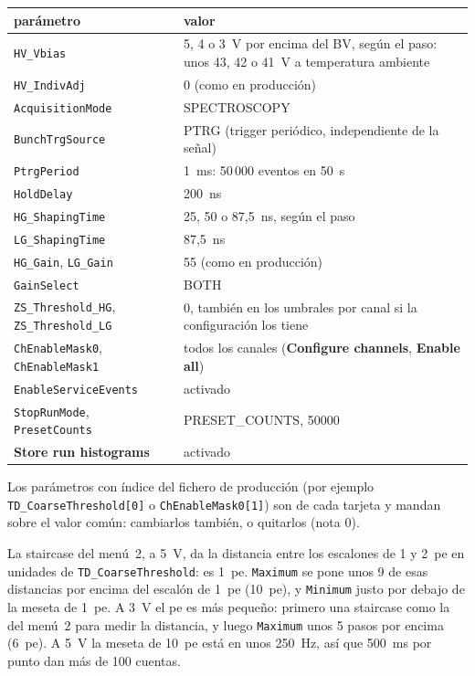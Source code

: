 \documentclass[11pt,a4paper]{article}
\begin{document}
\begin{center}
\small
\begin{tabular}{p{} p{}}
\hline
parámetro & valor \\
\hline
\texttt{HV\_Vbias} & 5, 4 o 3~V por encima del BV, según el paso: unos 43,
42 o 41~V a temperatura ambiente \\
\texttt{HV\_IndivAdj} & 0 (como en producción) \\
\texttt{AcquisitionMode} & SPECTROSCOPY \\
\texttt{BunchTrgSource} & PTRG (trigger periódico, independiente de la señal) \\
\texttt{PtrgPeriod} & 1~ms: 50\,000 eventos en 50~s \\
\texttt{HoldDelay} & 200~ns \\
\texttt{HG\_ShapingTime} & 25, 50 o 87,5~ns, según el paso \\
\texttt{LG\_ShapingTime} & 87,5~ns \\
\texttt{HG\_Gain}, \texttt{LG\_Gain} & 55 (como en producción) \\
\texttt{GainSelect} & BOTH \\
\texttt{ZS\_Threshold\_HG}, \texttt{ZS\_Threshold\_LG} & 0, también en los
umbrales por canal si la configuración los tiene \\
\texttt{ChEnableMask0}, \texttt{ChEnableMask1} & todos los canales
({\bf Configure channels}, {\bf Enable all}) \\
\texttt{EnableServiceEvents} & activado \\
\texttt{StopRunMode}, \texttt{PresetCounts} & PRESET\_COUNTS, 50000 \\
{\bf Store run histograms} & activado \\
\hline
\end{tabular}
\end{center}

\noindent Los parámetros con índice del fichero de producción (por ejemplo
\texttt{TD\_CoarseThreshold[0]} o \texttt{ChEnableMask0[1]}) son de cada
tarjeta y mandan sobre el valor común: cambiarlos también, o quitarlos
(nota 0).

 La staircase del menú~2,
a 5~V, da la distancia entre los escalones de 1 y 2~pe en unidades de
\texttt{TD\_CoarseThreshold}: es 1~pe. \texttt{Maximum} se pone unos 9 de
esas distancias por encima del escalón de 1~pe (10~pe), y \texttt{Minimum}
justo por debajo de la meseta de 1~pe. A 3~V el pe es más pequeño: primero
una staircase como la del menú~2 para medir la distancia, y luego
\texttt{Maximum} unos 5 pasos por encima (6~pe). A 5~V la meseta de 10~pe
está en unos 250~Hz, así que 500~ms por punto dan más de 100 cuentas.
\end{document}
